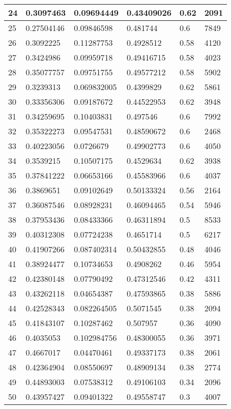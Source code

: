 \begin{longtable}{|l|l|l|l|l|l|}
24 & 0.3097463 & 0.09694449 & 0.43409026 & 0.62 & 2091 \\ \hline 
25 & 0.27504146 & 0.09846598 & 0.481744 & 0.6 & 7849 \\ \hline 
26 & 0.3092225 & 0.11287753 & 0.4928512 & 0.58 & 4120 \\ \hline 
27 & 0.3424986 & 0.09959718 & 0.49416715 & 0.58 & 4023 \\ \hline 
28 & 0.35077757 & 0.09751755 & 0.49577212 & 0.58 & 5902 \\ \hline 
29 & 0.3239313 & 0.069832005 & 0.4399829 & 0.62 & 5861 \\ \hline 
30 & 0.33356306 & 0.09187672 & 0.44522953 & 0.62 & 3948 \\ \hline 
31 & 0.34259695 & 0.10403831 & 0.497546 & 0.6 & 7992 \\ \hline 
32 & 0.35322273 & 0.09547531 & 0.48590672 & 0.6 & 2468 \\ \hline 
33 & 0.40223056 & 0.0726679 & 0.49902773 & 0.6 & 4050 \\ \hline 
34 & 0.3539215 & 0.10507175 & 0.4529634 & 0.62 & 3938 \\ \hline 
35 & 0.37841222 & 0.06653166 & 0.45583966 & 0.6 & 4037 \\ \hline 
36 & 0.3869651 & 0.09102649 & 0.50133324 & 0.56 & 2164 \\ \hline 
37 & 0.36087546 & 0.08928231 & 0.46094465 & 0.54 & 5946 \\ \hline 
38 & 0.37953436 & 0.08433366 & 0.46311894 & 0.5 & 8533 \\ \hline 
39 & 0.40312308 & 0.07724238 & 0.4651714 & 0.5 & 6217 \\ \hline 
40 & 0.41907266 & 0.087402314 & 0.50432855 & 0.48 & 4046 \\ \hline 
41 & 0.38924477 & 0.10734653 & 0.4908262 & 0.46 & 5954 \\ \hline 
42 & 0.42380148 & 0.07790492 & 0.47312546 & 0.42 & 4311 \\ \hline 
43 & 0.43262118 & 0.04654387 & 0.47593865 & 0.38 & 5886 \\ \hline 
44 & 0.42528343 & 0.082264505 & 0.5071545 & 0.38 & 2094 \\ \hline 
45 & 0.41843107 & 0.10287462 & 0.507957 & 0.36 & 4090 \\ \hline 
46 & 0.4035053 & 0.102984756 & 0.48300055 & 0.36 & 3971 \\ \hline 
47 & 0.4667017 & 0.04470461 & 0.49337173 & 0.38 & 2061 \\ \hline 
48 & 0.42364904 & 0.08550697 & 0.48909134 & 0.38 & 2774 \\ \hline 
49 & 0.44893003 & 0.07538312 & 0.49106103 & 0.34 & 2096 \\ \hline 
50 & 0.43957427 & 0.09401322 & 0.49558747 & 0.3 & 4007 \\ \hline 
\end{longtable}